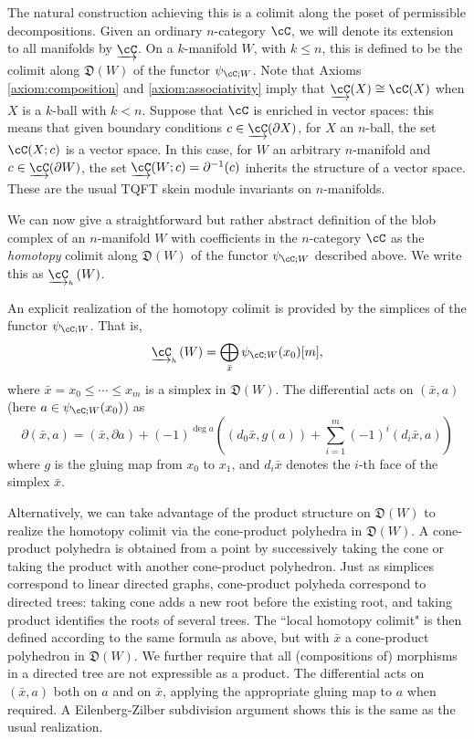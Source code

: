 \documentclass{pnastwo}
\newcommand{\cl}[1]{\underrightarrow{#1}}
\newcommand{\clh}[1]{\underrightarrow{#1}_{{}_{{}_{{}_h}}}}
\newcommand{\cell}{\mathfrak{D}}
\newcommand{\iso}{\cong}
\newcommand{\DirectSum}{\bigoplus}
\newcommand{\bdy}{\partial}
\begin{document}
\begin{article}
The natural construction achieving this is a colimit along the poset of permissible decompositions.
Given an ordinary $n$-category $\cC$, 
we will denote its extension to all manifolds by $\cl{\cC}$. On a $k$-manifold $W$, with $k \leq n$, 
this is defined to be the colimit along $\cell(W)$ of the functor $\psi_{\cC;W}$. 
Note that Axioms \ref{axiom:composition} and \ref{axiom:associativity} 
imply that $\cl{\cC}(X)  \iso \cC(X)$ when $X$ is a $k$-ball with $k<n$. 
Suppose that $\cC$ is enriched in vector spaces: this means that given boundary conditions $c \in \cl{\cC}(\bdy X)$, for $X$ an $n$-ball, 
the set $\cC(X;c)$ is a vector space. 
In this case, for $W$ an arbitrary $n$-manifold and $c \in \cl{\cC}(\bdy W)$,
the set $\cl{\cC}(W;c) = \bdy^{-1} (c)$ inherits the structure of a vector space. 
These are the usual TQFT skein module invariants on $n$-manifolds.

We can now give a straightforward but rather abstract definition of the blob complex of an $n$-manifold $W$
with coefficients in the $n$-category $\cC$ as the {\it homotopy} colimit along $\cell(W)$
of the functor $\psi_{\cC; W}$ described above. We write this as $\clh{\cC}(W)$.

An explicit realization of the homotopy colimit is provided by the simplices of the 
functor $\psi_{\cC; W}$. That is, $$\clh{\cC}(W) = \DirectSum_{\bar{x}} \psi_{\cC; W}(x_0)[m],$$ 
where $\bar{x} = x_0 \leq \cdots \leq x_m$ is a simplex in $\cell(W)$. 
The differential acts on $(\bar{x},a)$ (here $a \in \psi_{\cC; W}(x_0)$) as
$$\bdy (\bar{x},a) = (\bar{x}, \bdy a) + (-1)^{\deg a} \left( (d_0 \bar{x}, g(a)) + \sum_{i=1}^m (-1)^i (d_i \bar{x}, a) \right)$$
where $g$ is the gluing map from $x_0$ to $x_1$, and $d_i \bar{x}$ denotes the $i$-th face of the simplex $\bar{x}$.

Alternatively, we can take advantage of the product structure on $\cell(W)$ to realize the 
homotopy colimit via the cone-product polyhedra in $\cell(W)$. 
A cone-product polyhedra is obtained from a point by successively taking the cone or taking the 
product with another cone-product polyhedron. Just as simplices correspond to linear directed graphs, 
cone-product polyheda correspond to directed trees: taking cone adds a new root before the existing root, 
and taking product identifies the roots of several trees. 
The ``local homotopy colimit" is then defined according to the same formula as above, but with $\bar{x}$ a cone-product polyhedron in $\cell(W)$. 
We further require that all (compositions of) morphisms in a directed tree are not expressible as a product.
The differential acts on $(\bar{x},a)$ both on $a$ and on $\bar{x}$, applying the appropriate gluing map to $a$ when required.
A Eilenberg-Zilber subdivision argument shows this is the same as the usual realization. 


\end{article}
\end{document}
